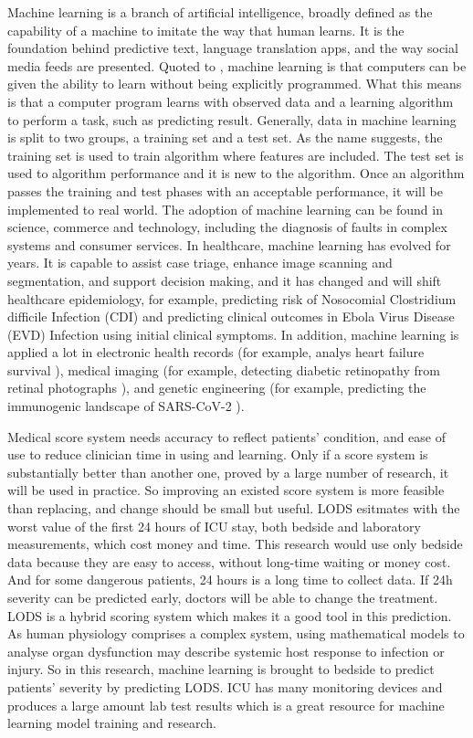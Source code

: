 \documentclass[12pt,a4paper,english
]{tunithesis}
\begin{document}
Machine learning is a branch of artificial intelligence, broadly defined as the capability of a machine to imitate the way that human learns. It is the foundation behind predictive text, language translation apps, and the way social media feeds are presented. \parencite{sara2021} Quoted to \textcite{samuel1959}, machine learning is that computers can be given the ability to learn without being explicitly programmed. What this means is that a computer program learns with observed data and a learning algorithm to perform a task, such as predicting result. Generally, data in machine learning is split to two groups, a training set and a test set. As the name suggests, the training set is used to train algorithm where features are included. The test set is used to algorithm performance and it is new to the algorithm. Once an algorithm passes the training and test phases with an acceptable performance, it will be implemented to real world. The adoption of machine learning can be found in science, commerce and technology, including the diagnosis of faults in complex systems and consumer services. \parencite{jorden2015} In healthcare, machine learning has evolved for years. It is capable to assist case triage, enhance image scanning and segmentation, and support decision making, and it has changed and will shift healthcare epidemiology, for example, predicting risk of Nosocomial Clostridium difficile Infection (CDI) and predicting clinical outcomes in Ebola Virus Disease (EVD) Infection using initial clinical symptoms. \parencite{Jenna2017, Habehh2021} In addition, machine learning is applied a lot in electronic health records (for example, analys heart failure survival \parencite{Panahiazar2015}), medical imaging (for example, detecting diabetic retinopathy from retinal photographs \parencite{Gulshan2016}), and genetic engineering (for example, predicting the immunogenic landscape of SARS-CoV-2 \parencite{Malone2020} ).

Medical score system needs accuracy to reflect patients’ condition, and ease of use to reduce clinician time in using and learning. Only if a score system is substantially better than another one, proved by a large number of research, it will be used in practice. So improving an existed score system is more feasible than replacing, and change should be small but useful. LODS esitmates with the worst value of the first 24 hours of ICU stay, both bedside and laboratory measurements, which cost money and time. This research would use only bedside data because they are easy to access, without long-time waiting or money cost. And for some dangerous patients, 24 hours is a long time to collect data. If 24h severity can be predicted early, doctors will be able to change the treatment. LODS is a hybrid scoring system which makes it a good tool in this prediction. As human physiology comprises a complex system, using mathematical models to analyse organ dysfunction may describe systemic host response to infection or injury. \parencite{seely2011} So in this research, machine learning is brought to bedside to predict patients' severity by predicting LODS. ICU has many monitoring devices and produces a large amount lab test results which is a great resource for machine learning model training and research.
\end{document}
